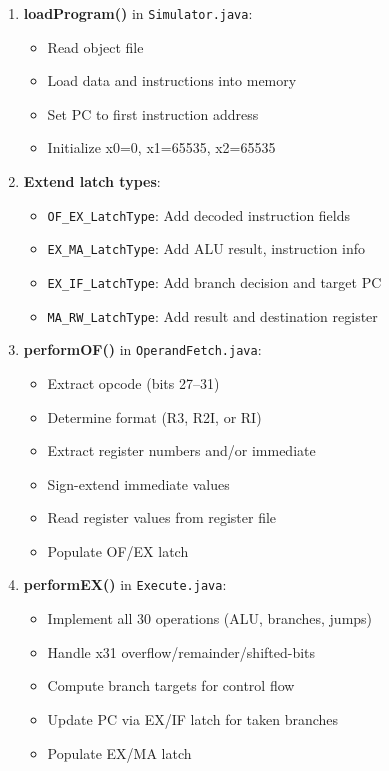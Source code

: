 \documentclass[12pt,a4paper]{article}
\begin{document}
\begin{tcolorbox}[colback=blue!5, colframe=blue!50!black, title=Implementation Checklist]
\begin{enumerate}
    \item \textbf{loadProgram()} in \texttt{Simulator.java}:
    \begin{itemize}
        \item Read object file
        \item Load data and instructions into memory
        \item Set PC to first instruction address
        \item Initialize x0=0, x1=65535, x2=65535
    \end{itemize}

    \item \textbf{Extend latch types}:
    \begin{itemize}
        \item \texttt{OF\_EX\_LatchType}: Add decoded instruction fields
        \item \texttt{EX\_MA\_LatchType}: Add ALU result, instruction info
        \item \texttt{EX\_IF\_LatchType}: Add branch decision and target PC
        \item \texttt{MA\_RW\_LatchType}: Add result and destination register
    \end{itemize}

    \item \textbf{performOF()} in \texttt{OperandFetch.java}:
    \begin{itemize}
        \item Extract opcode (bits 27--31)
        \item Determine format (R3, R2I, or RI)
        \item Extract register numbers and/or immediate
        \item Sign-extend immediate values
        \item Read register values from register file
        \item Populate OF/EX latch
    \end{itemize}

    \item \textbf{performEX()} in \texttt{Execute.java}:
    \begin{itemize}
        \item Implement all 30 operations (ALU, branches, jumps)
        \item Handle x31 overflow/remainder/shifted-bits
        \item Compute branch targets for control flow
        \item Update PC via EX/IF latch for taken branches
        \item Populate EX/MA latch
    \end{itemize}


\end{enumerate}
\end{tcolorbox}
\end{document}
